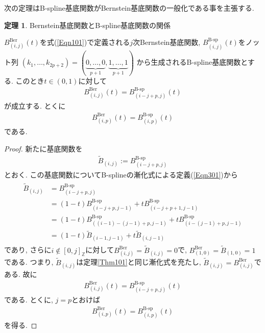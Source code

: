 \documentclass{jsarticle}
\newcommand\squa[1]{[#1]}
\newcommand\Z[2]{\squa{#1,#2}_\mathbb{Z}}
\theoremstyle{definition}%
\newtheorem{thm}{定理}
\begin{document}
\newpage
次の定理はB-spline基底関数がBernstein基底関数の一般化である事を主張する.
\begin{screen}
	\begin{thm}
		\label{Thm307}
		Bernstein基底関数とB-spline基底関数の関係

		$B_{(i,j)}^{\text{Ber}}(t)$を式(\ref{Eqn101})で定義される$j$次Bernstein基底関数,
		$B_{(i,j)}^{\text{B-sp}}(t)$をノット列
		$
			(k_1,\dots,k_{2p+2})
			=
			(
			\underbrace{0,\dots,0}_{p+1},
			\underbrace{1,\dots,1}_{p+1}
			)
		$
		から生成されるB-spline基底関数とする.
		このとき$t\in (0,1)$に対して
		\begin{align}
			B_{(i,j)}^{\text{Ber}}(t)=B_{(i-j+p,j)}^{\text{B-sp}}(t)
		\end{align}
		が成立する.
		とくに
		\begin{align}
			B_{(i,p)}^{\text{Ber}}(t)=B_{(i,p)}^{\text{B-sp}}(t)
		\end{align}
		である.
	\end{thm}
\end{screen}
\begin{proof}
	新たに基底関数を
	\begin{align}
		\tilde{B}_{(i,j)}:=B_{(i-j+p,j)}^{\text{B-sp}}
	\end{align}
	とおく.
	この基底関数についてB-splineの漸化式による定義(\ref{Eqn301})から
	\begin{align}
		\begin{aligned}
			\tilde{B}_{(i,j)}
			&=B_{(i-j+p,j)}^{\text{B-sp}} \\
			&=(1-t)B_{(i-j+p,j-1)}^{\text{B-sp}}+tB_{(i-j+p+1,j-1)}^{\text{B-sp}} \\
			&=(1-t)B_{((i-1)-(j-1)+p,j-1)}^{\text{B-sp}}+tB_{(i-(j-1)+p,j-1)}^{\text{B-sp}} \\
			&=(1-t)\tilde{B}_{(i-1,j-1)}+t\tilde{B}_{(i,j-1)}
		\end{aligned}
	\end{align}
	であり, さらに$i\notin \Z{0}{j}$に対して$B_{(i,j)}^{\text{Ber}}=\tilde{B}_{(i,j)}=0$で, $B_{(1,0)}^{\text{Ber}}=\tilde{B}_{(1,0)}=1$である.
    つまり, $\tilde{B}_{(i,j)}$は定理\ref{Thm101}と同じ漸化式を充たし, $\tilde{B}_{(i,j)}=B_{(i,j)}^{\text{Ber}}$である.
	故に
	\begin{align}
		B_{(i,j)}^{\text{Ber}}(t)=B_{(i-j+p,j)}^{\text{B-sp}}(t)
	\end{align}
	である.
    とくに, $j=p$とおけば
	\begin{align}
		B_{(i,p)}^{\text{Ber}}(t)=B_{(i,p)}^{\text{B-sp}}(t)
	\end{align}
	を得る.\footnotemark
\end{proof}
\end{document}
